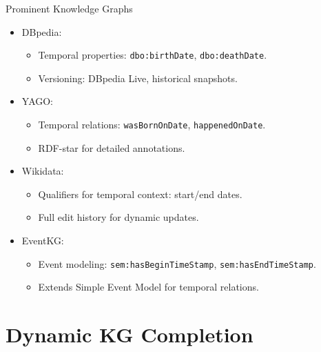 \documentclass{beamer}
\begin{document}
    \begin{frame}{Prominent Knowledge Graphs}
        \begin{itemize}
            \item DBpedia:
            \begin{itemize}
                \item Temporal properties: \texttt{dbo:birthDate}, \texttt{dbo:deathDate}.
                \item Versioning: DBpedia Live, historical snapshots.
            \end{itemize}
            \item YAGO:
            \begin{itemize}
                \item Temporal relations: \texttt{wasBornOnDate}, \texttt{happenedOnDate}.
                \item RDF-star for detailed annotations.
            \end{itemize}
            \item Wikidata:
            \begin{itemize}
                \item Qualifiers for temporal context: start/end dates.
                \item Full edit history for dynamic updates.
            \end{itemize}
            \item EventKG:
            \begin{itemize}
                \item Event modeling: \texttt{sem:hasBeginTimeStamp}, \texttt{sem:hasEndTimeStamp}.
                \item Extends Simple Event Model for temporal relations.
            \end{itemize}
        \end{itemize}
    \end{frame}
     

    \section{Dynamic KG Completion}
\end{document}
